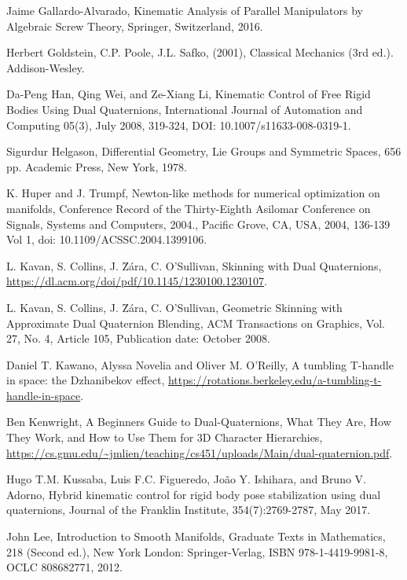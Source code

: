 \documentclass[reqno,12pt]{amsart}
\begin{document}
\begin{thebibliography}{99}
 Jaime Gallardo-Alvarado, Kinematic Analysis of Parallel Manipulators by Algebraic Screw Theory, Springer, Switzerland, 2016.

 Herbert Goldstein, C.P. Poole, J.L. Safko, (2001), Classical Mechanics (3rd ed.). Addison-Wesley.

 Da-Peng Han, Qing Wei, and Ze-Xiang Li, Kinematic Control of Free Rigid Bodies Using Dual Quaternions, International Journal of Automation and Computing
05(3), July 2008, 319-324, DOI: 10.1007/s11633-008-0319-1.

 Sigurdur Helgason, Differential Geometry, Lie Groups and Symmetric Spaces, 656 pp. Academic Press, New York, 1978.

 K. Huper and J. Trumpf, Newton-like methods for numerical optimization on manifolds, Conference Record of the Thirty-Eighth Asilomar Conference on Signals, Systems and Computers, 2004., Pacific Grove, CA, USA, 2004, 136-139 Vol 1, doi: 10.1109/ACSSC.2004.1399106.

 L. Kavan, S. Collins, J. \u Z\'ara, C. O'Sullivan, Skinning with Dual Quaternions, \url{https://dl.acm.org/doi/pdf/10.1145/1230100.1230107}.

 L. Kavan, S. Collins, J. \u Z\'ara, C. O'Sullivan, Geometric Skinning with Approximate Dual Quaternion Blending, ACM Transactions on Graphics, Vol. 27, No. 4, Article 105, Publication date: October 2008.

 Daniel T. Kawano, Alyssa Novelia and Oliver M. O'Reilly, A tumbling T-handle in space: the Dzhanibekov effect, \url{https://rotations.berkeley.edu/a-tumbling-t-handle-in-space}.

 Ben Kenwright, A Beginners Guide to Dual-Quaternions, What They Are, How They Work, and How to Use Them for 3D Character Hierarchies, \url{https://cs.gmu.edu/~jmlien/teaching/cs451/uploads/Main/dual-quaternion.pdf}.

 Hugo T.M. Kussaba, Luis F.C. Figueredo, Jo\~ao Y. Ishihara, and Bruno V. Adorno, Hybrid kinematic control for rigid body pose stabilization using dual quaternions, Journal of the Franklin Institute, 354(7):2769-2787, May 2017.

 John Lee, Introduction to Smooth Manifolds, Graduate Texts in Mathematics, 218 (Second ed.), New York London: Springer-Verlag, ISBN 978-1-4419-9981-8, OCLC 808682771, 2012.


\end{thebibliography}
\end{document}
